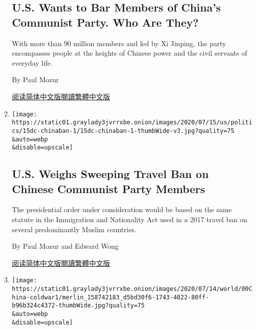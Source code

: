 \begin{enumerate}
  \hypertarget{us-wants-to-bar-members-of-chinas-communist-party-who-are-they}{%
  \subsection{U.S. Wants to Bar Members of China's Communist Party. Who
  Are
  They?}\label{us-wants-to-bar-members-of-chinas-communist-party-who-are-they}}

  With more than 90 million members and led by Xi Jinping, the party
  encompasses people at the heights of Chinese power and the civil
  servants of everyday life.

  By Paul Mozur

  \href{https://cn.nytimes3xbfgragh.onion/usa/20200717/china-communist-party-travel-ban-explain/}{阅读简体中文版}\href{https://cn.nytimes3xbfgragh.onion/usa/20200717/china-communist-party-travel-ban-explain/zh-han}{閱讀繁體中文版}
\item
  \href{/2020/07/15/us/politics/china-travel-ban.html}{}

  \texttt{[image: https://static01.graylady3jvrrxbe.onion/images/2020/07/15/us/politics/15dc-chinaban-1/15dc-chinaban-1-thumbWide-v3.jpg?quality=75\\\&auto=webp\\\&disable=upscale]}

  \hypertarget{us-weighs-sweeping-travel-ban-on-chinese-communist-party-members}{%
  \subsection{U.S. Weighs Sweeping Travel Ban on Chinese Communist Party
  Members}\label{us-weighs-sweeping-travel-ban-on-chinese-communist-party-members}}

  The presidential order under consideration would be based on the same
  statute in the Immigration and Nationality Act used in a 2017 travel
  ban on several predominantly Muslim countries.

  By Paul Mozur and Edward Wong

  \href{https://cn.nytimes3xbfgragh.onion/usa/20200716/china-travel-ban/}{阅读简体中文版}\href{https://cn.nytimes3xbfgragh.onion/usa/20200716/china-travel-ban/zh-hant/}{閱讀繁體中文版}
\item
  \href{/2020/07/14/world/asia/cold-war-china-us.html}{}

  \texttt{[image: https://static01.graylady3jvrrxbe.onion/images/2020/07/14/world/00China-coldwar1/merlin\_158742183\_d5bd30f6-1743-4022-80ff-b96b324c4372-thumbWide.jpg?quality=75\\\&auto=webp\\\&disable=upscale]}


\end{enumerate}
